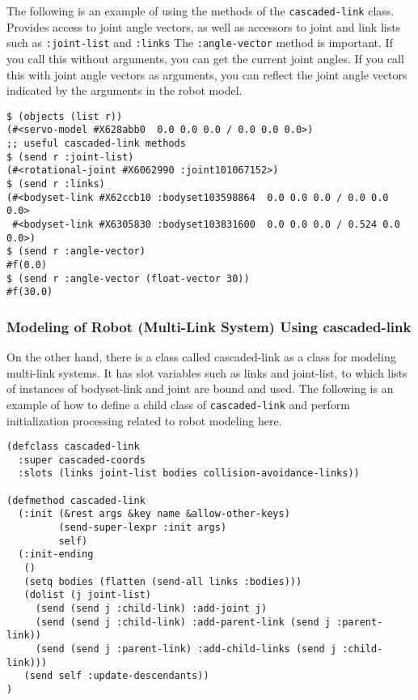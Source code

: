 The following is an example of using the methods of the \verb|cascaded-link| class.
Provides access to joint angle vectors, as well as accessors to joint and link lists such as \verb|:joint-list| and \verb|:links|
The \verb|:angle-vector| method is important. If you call this without arguments, you can get the current joint angles. If you call this with joint angle vectors as arguments, you can reflect the joint angle vectors indicated by the arguments in the robot model.
{\baselineskip=10pt
\begin{verbatim}
$ (objects (list r))
(#<servo-model #X628abb0  0.0 0.0 0.0 / 0.0 0.0 0.0>)
;; useful cascaded-link methods
$ (send r :joint-list)
(#<rotational-joint #X6062990 :joint101067152>)
$ (send r :links)
(#<bodyset-link #X62ccb10 :bodyset103598864  0.0 0.0 0.0 / 0.0 0.0 0.0>
 #<bodyset-link #X6305830 :bodyset103831600  0.0 0.0 0.0 / 0.524 0.0 0.0>)
$ (send r :angle-vector)
#f(0.0)
$ (send r :angle-vector (float-vector 30))
#f(30.0)
\end{verbatim}
}

\subsubsection{Modeling of Robot (Multi-Link System) Using cascaded-link}

On the other hand, there is a class called cascaded-link as a class for modeling multi-link systems.
It has slot variables such as links and joint-list, to which lists of instances of bodyset-link and joint are bound and used.
The following is an example of how to define a child class of \verb|cascaded-link| and perform initialization processing related to robot modeling here.


{\baselineskip=10pt
\begin{verbatim}
(defclass cascaded-link
  :super cascaded-coords
  :slots (links joint-list bodies collision-avoidance-links))

(defmethod cascaded-link
  (:init (&rest args &key name &allow-other-keys)
         (send-super-lexpr :init args)
         self)
  (:init-ending
   ()
   (setq bodies (flatten (send-all links :bodies)))
   (dolist (j joint-list)
     (send (send j :child-link) :add-joint j)
     (send (send j :child-link) :add-parent-link (send j :parent-link))
     (send (send j :parent-link) :add-child-links (send j :child-link)))
   (send self :update-descendants))
)
\end{verbatim}
}

